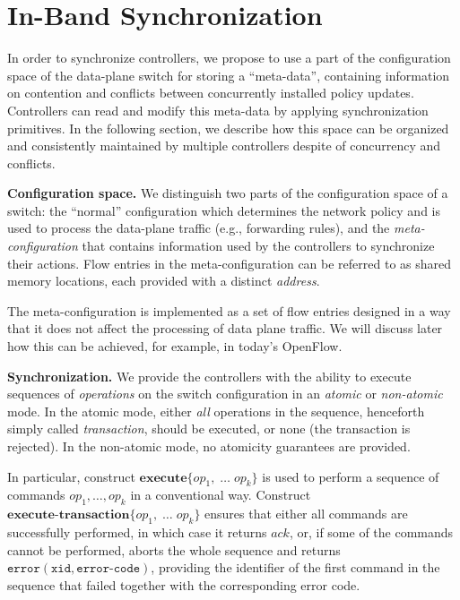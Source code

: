 \documentclass{sig-alternate-2006}
\newcommand{\liron}[1]{\textit{\textcolor{mypurple}{[liron]: #1}}} %
\newcommand{\petr}[1]{\textit{\textcolor{blue}{[petr]: #1}}} %
\newcommand{\error}{\texttt{error}}
\newcommand{\xid}{\texttt{xid}}
\newcommand{\ecode}{\texttt{error-code}}
\newcommand{\exec}{\textbf{execute}}
\newcommand{\execatomic}{\textbf{execute-transaction}}
\newcommand{\ack}{\textit{ack}}
\begin{document}
\section{In-Band Synchronization}\label{sec:main}

In order to synchronize controllers, 
we propose to use a part of the configuration space of the data-plane
switch for storing  a 
``meta-data'', containing information
on contention and conflicts between
concurrently installed policy updates. 
Controllers can read and modify
this meta-data by applying synchronization primitives.
In the following section, we
describe how this space can be organized and consistently maintained
by multiple controllers despite of concurrency and conflicts.


\vspace{1mm}
\noindent\textbf{Configuration space.}
%
We distinguish two parts of the configuration space of a switch:
the ``normal'' configuration which determines the network policy and
is used to process the data-plane traffic (e.g., forwarding rules),
and the \emph{meta-configuration} that contains information used by the
controllers to synchronize their actions.
Flow entries in the meta-configuration can be referred to as shared
memory locations, each provided with a distinct \emph{address}.

The meta-configuration is implemented as a set of flow entries
designed in a way that it does not affect the processing of data plane
traffic. 
We will discuss later how this can be achieved, for example, in 
today's OpenFlow. 


\vspace{1mm}
\noindent\textbf{Synchronization.}
We provide the controllers with the ability to execute
sequences of \emph{operations} on the
switch configuration in an \emph{atomic} or \emph{non-atomic} mode.
In the atomic mode, either \emph{all} operations in the sequence, henceforth simply
called \emph{transaction},
should be executed, or none (the transaction is rejected).
In the non-atomic mode, no atomicity guarantees are provided.
%

In particular, construct $\exec\{op_1,\;\ldots\;op_k\}$ is used to perform a sequence of commands $op_1,\ldots,op_k$ in
a conventional way.
Construct $\execatomic\{op_1,\;\ldots\;op_k\}$ ensures that either all
commands are successfully performed, in which case it returns
$\ack$, or, if some of the commands cannot be performed, aborts the
whole sequence and returns
$\error(\xid,\ecode)$, providing
the identifier of the first command in the sequence that failed
together with the corresponding error code.
\end{document}
